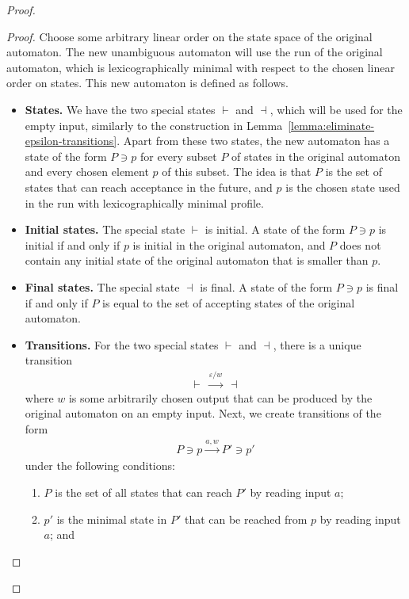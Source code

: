 \begin{proof}
\begin{proof}
        Choose some arbitrary linear order on the state space of the original automaton. The new unambiguous automaton will use the run of the original automaton, which is lexicographically minimal with respect to the chosen linear order on states. This new automaton is defined as follows.  
        \begin{itemize}
            \item \textbf{States.} We have the two special states $\vdash$ and $\dashv$, which will be used for the empty input, similarly to the construction in Lemma~\ref{lemma:eliminate-epsilon-transitions}. Apart from these two states, the new automaton has a state  of the form    $P \ni p$ for every subset  $P$ of states in the original automaton and every chosen element $p$ of this subset.  The  idea is that $P$ is the set of states that can reach acceptance in the future, and $p$ is the chosen state used in the run with lexicographically minimal profile.
            \item \textbf{Initial states.} The special state $\vdash$ is initial.  A state  of the form  $P \ni p$ is initial  if and only if  $p$ is initial in the original automaton, and $P$ does not contain any initial state of the original automaton that is smaller than $p$.
            \item \textbf{Final states.} The special state $\dashv$ is final.  A state of the form $P \ni p$ is final  if and only if  $P$ is equal to the set of accepting states of the original automaton.
            \item \textbf{Transitions.} For the two special states $\vdash$ and $\dashv$, there is a unique transition 
            \begin{align*}
            \vdash \ \xrightarrow{ \varepsilon / w} \ \dashv
            \end{align*}
            where $w$ is some arbitrarily chosen output that can be produced by the original automaton on an empty input. Next, we create transitions of the form 
        \begin{align*}
        P \ni p
        \xrightarrow {a,w}
        P' \ni p'
        \end{align*}
        under the following conditions:
        \begin{enumerate}
            \item $P$ is the set of all states that can reach $P'$ by reading input $a$;
            \item $p'$ is the minimal state in $P'$ that can be reached from $p$ by reading input $a$; and

\end{enumerate}
\end{itemize}
\end{proof}
\end{proof}
